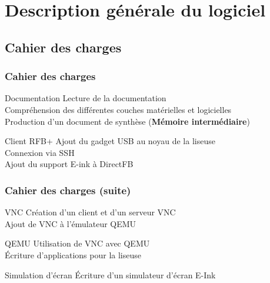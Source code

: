 \section[Description]{Description générale du logiciel}
\subsection{Cahier des charges}

\begin{frame}
 \frametitle{Cahier des charges}
%
%


\begin{block}{Documentation}
Lecture de la documentation\\
Compréhension des différentes couches matérielles et logicielles\\
Production d'un document de synthèse (\textbf{Mémoire intermédiaire})\\
\end{block}

\begin{block}{Client RFB+}
Ajout du gadget USB au noyau de la liseuse\\
Connexion via SSH\\
Ajout du support E-ink à DirectFB\\
\end{block}

\end{frame}

\begin{frame}
\frametitle{Cahier des charges (suite)}
\begin{block}{VNC}
Création d'un client et d'un serveur VNC\\
Ajout de VNC à l'émulateur QEMU\\
\end{block}

\begin{block}{QEMU}
Utilisation de VNC avec QEMU\\
Écriture d'applications pour la liseuse\\
\end{block}

\begin{block}{Simulation d'écran}
Écriture d'un simulateur d'écran E-Ink\\
\end{block}

\end{frame}